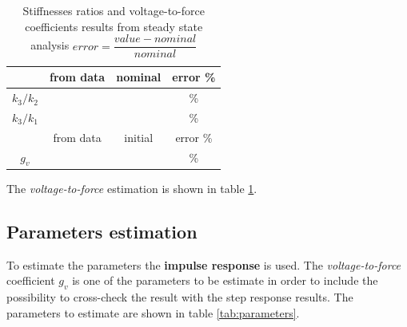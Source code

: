 \documentclass[twosided,a4paper]{article}           %
\begin{document}
\begin{table}[H]
	\centering
	\begin{tabular}{|c|c|c|c|}
		\hline 
		 & from data & nominal & error \% \\ 
		\hline 
		$k_3/k_2$ & &  & \%  \\ 
		\hline 
		$k_3/k_1$ & &  & \% \\
		\hline \hline
		      & from data              & initial & error 
		      \%\\
		\hline
		$g_v$ &  &  & \% \\\hline
	\end{tabular} 
	\caption{Stiffnesses ratios and voltage-to-force coefficients results from steady state analysis $error = \dfrac{value-nominal}{nominal}$}
		\label{tab:ratios}
\end{table}
The \textit{voltage-to-force} estimation is shown in table \ref{tab:ratios}.
\newpage
\subsection{Parameters estimation}
To estimate the parameters the \textbf{impulse response} is used. The \textit{voltage-to-force} coefficient $g_v$ is one of the parameters to be estimate in order to include the possibility to cross-check the result with the step response results.
The parameters to estimate are shown in table \ref{tab:parameters}.
\end{document}
